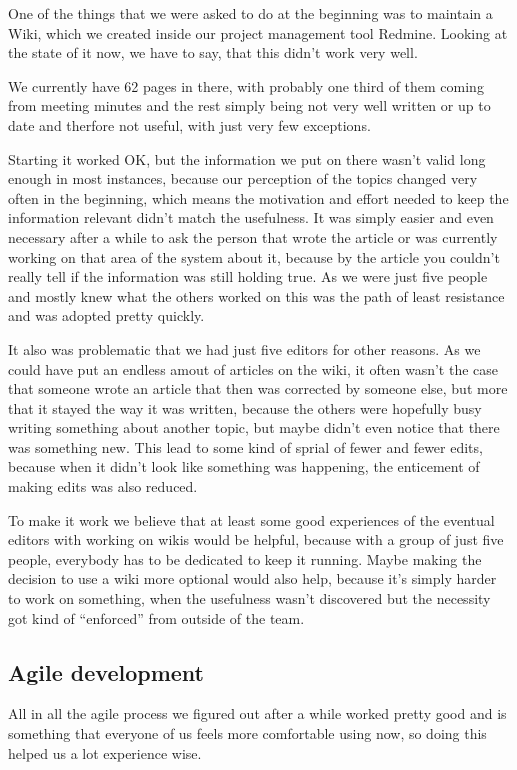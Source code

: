 One of the things that we were asked to do at the beginning was to maintain a Wiki, which we created inside our project management tool Redmine. Looking at the state of it now, we have to say, that this didn't work very well. 

We currently have 62 pages in there, with probably one third of them coming from meeting minutes and the rest simply being not very well written or up to date and therfore not useful, with just very few exceptions.

Starting it worked OK, but the information we put on there wasn't valid long enough in most instances, because our perception of the topics changed very often in the beginning, which means the motivation and effort needed to keep the information relevant didn't match the usefulness. It was simply easier and even necessary after a while to ask the person that wrote the article or was currently working on that area of the system about it, because by the article you couldn't really tell if the information was still holding true. As we were just five people and mostly knew what the others worked on this was the path of least resistance and was adopted pretty quickly.

It also was problematic that we had just five editors for other reasons. As we could have put an endless amout of articles on the wiki, it often wasn't the case that someone wrote an article that then was corrected by someone else, but more that it stayed the way it was written, because the others were hopefully busy writing something about another topic, but maybe didn't even notice that there was something new. This lead to some kind of sprial of fewer and fewer edits, because when it didn't look like something was happening, the enticement of making edits was also reduced.

To make it work we believe that at least some good experiences of the eventual editors with working on wikis would be helpful, because with a group of just five people, everybody has to be dedicated to keep it running. Maybe making the decision to use a wiki more optional would also help, because it's simply harder to work on something, when the usefulness wasn't discovered but the necessity got kind of \enquote{enforced} from outside of the team.


\subsection{Agile development}

All in all the agile process we figured out after a while worked pretty good and is something that everyone of us feels more comfortable using now, so doing this helped us a lot experience wise. 

